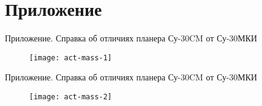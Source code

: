 
\section{Приложение}

\begin{frame}{Приложение. Справка об отличиях планера Су-30CM от Су-30МКИ}
	\centering
	\begin{figure}
		\texttt{[image: act-mass-1]}
	\end{figure}
\end{frame}

\begin{frame}{Приложение. Справка об отличиях планера Су-30CM от Су-30МКИ}
	\centering
	\begin{figure}
		\texttt{[image: act-mass-2]}
	\end{figure}
\end{frame}
